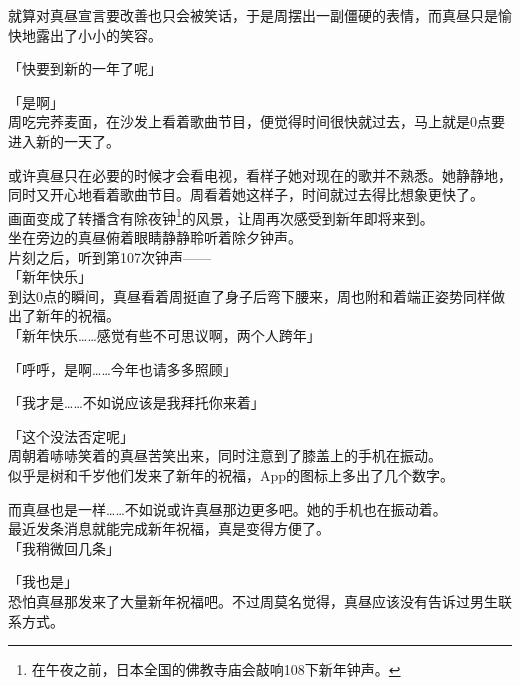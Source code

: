 就算对真昼宣言要改善也只会被笑话，于是周摆出一副僵硬的表情，而真昼只是愉快地露出了小小的笑容。\\

\vspace{2\baselineskip}

「快要到新的一年了呢」

「是啊」\\

周吃完荞麦面，在沙发上看着歌曲节目，便觉得时间很快就过去，马上就是0点要进入新的一天了。

或许真昼只在必要的时候才会看电视，看样子她对现在的歌并不熟悉。她静静地，同时又开心地看着歌曲节目。周看着她这样子，时间就过去得比想象更快了。\\

画面变成了转播含有除夜钟\footnote{在午夜之前，日本全国的佛教寺庙会敲响108下新年钟声。}的风景，让周再次感受到新年即将来到。\\

坐在旁边的真昼俯着眼睛静静聆听着除夕钟声。\\

片刻之后，听到第107次钟声——\\

「新年快乐」\\

到达0点的瞬间，真昼看着周挺直了身子后弯下腰来，周也附和着端正姿势同样做出了新年的祝福。\\

「新年快乐……感觉有些不可思议啊，两个人跨年」

「呼呼，是啊……今年也请多多照顾」

「我才是……不如说应该是我拜托你来着」

「这个没法否定呢」\\

周朝着哧哧笑着的真昼苦笑出来，同时注意到了膝盖上的手机在振动。\\

似乎是树和千岁他们发来了新年的祝福，App的图标上多出了几个数字。

而真昼也是一样……不如说或许真昼那边更多吧。她的手机也在振动着。\\

最近发条消息就能完成新年祝福，真是变得方便了。\\

「我稍微回几条」

「我也是」\\

恐怕真昼那发来了大量新年祝福吧。不过周莫名觉得，真昼应该没有告诉过男生联系方式。\\


